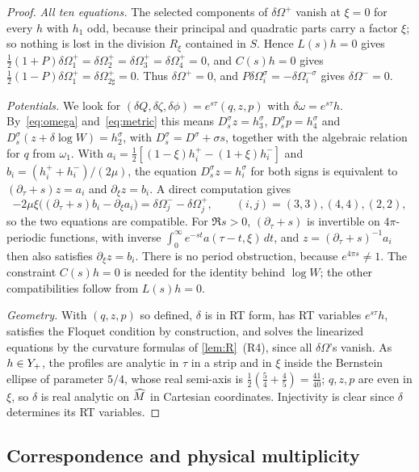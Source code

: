 \begin{proof}
\emph{All ten equations.} The selected components of $\delta\Omega^+$ vanish at $\xi=0$ for every $h$ with $h_1$
odd, because their principal and quadratic parts carry a factor $\xi$; so nothing is lost in the division
$R_\xi$ contained in $S$. Hence $L(s)h=0$ gives $\tfrac12(1+P)\delta\Omega_1^+=\delta\Omega_2^+=\delta\Omega_3^+=
\delta\Omega_4^+=0$, and $C(s)h=0$ gives $\tfrac12(1-P)\delta\Omega_1^+=\delta\Omega_{2\sharp}^+=0$. Thus
$\delta\Omega^+=0$, and $P\delta\Omega_i^\sigma=-\delta\Omega_i^{-\sigma}$ gives $\delta\Omega^-=0$.

\emph{Potentials.} We look for $(\delta Q,\delta\zeta,\delta\phi)=e^{s\tau}(q,z,p)$ with
$\delta\omega=e^{s\tau}h$. By~\eqref{eq:omega} and~\eqref{eq:metric} this means
$D^\sigma_s z=h_3^\sigma$, $D_s^\sigma p=h_4^\sigma$ and $D_s^\sigma(z+\delta\log W)=h_2^\sigma$, with
$D_s^\sigma=D^\sigma+\sigma s$, together with the algebraic relation for $q$ from $\omega_1$. With
$a_i=\tfrac12[(1-\xi)h_i^+-(1+\xi)h_i^-]$ and $b_i=(h_i^++h_i^-)/(2\mu)$, the equation $D_s^\sigma z=h_i^\sigma$ for
both signs is equivalent to $(\partial_\tau+s)z=a_i$ and $\partial_\xi z=b_i$. A direct computation gives
\[
  -2\mu\xi\big((\partial_\tau+s)b_i-\partial_\xi a_i\big)=\delta\Omega_j^--\delta\Omega_j^+,\qquad (i,j)=(3,3),(4,4),(2,2),
\]
so the two equations are compatible. For $\Re s>0$, $(\partial_\tau+s)$ is invertible on $4\pi$-periodic
functions, with inverse $\int_0^\infty e^{-st}a(\tau-t,\xi)\,dt$, and $z=(\partial_\tau+s)^{-1}a_i$ then also
satisfies $\partial_\xi z=b_i$. There is no period obstruction, because $e^{4\pi s}\neq1$. The constraint
$C(s)h=0$ is needed for the identity behind $\log W$; the other compatibilities follow from $L(s)h=0$.

\emph{Geometry.} With $(q,z,p)$ so defined, $\delta$ is in RT form, has RT variables $e^{s\tau}h$, satisfies
the Floquet condition by construction, and solves the linearized equations by the curvature formulas of
\cref{lem:R}~(R4), since all $\delta\Omega$'s vanish. As $h\in Y_{+}$, the profiles are analytic in $\tau$ in a
strip and in $\xi$ inside the Bernstein ellipse of parameter $5/4$, whose real semi-axis is
$\tfrac12(\tfrac54+\tfrac45)=\tfrac{41}{40}$; $q,z,p$ are even in $\xi$, so $\delta$ is real analytic on $\widehat M$ in
Cartesian coordinates. Injectivity is clear since $\delta$ determines its RT variables.
\end{proof}

\subsection{Correspondence and physical multiplicity}\label{sec:physical-count}

